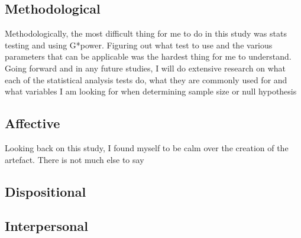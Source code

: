 \documentclass[conference]{IEEEtran}
\begin{document}

\subsection{Methodological}
Methodologically, the most difficult thing for me to do in this study was stats testing and using G*power. Figuring out what test to use and the various parameters that can be applicable was the hardest thing for me to understand. Going forward and in any future studies, I will do extensive research on what each of the statistical analysis tests do, what they are commonly used for and what variables I am looking for when determining sample size or null hypothesis

\subsection{Affective}
Looking back on this study, I found myself to be calm over the creation of the artefact. There is not much else to say
\subsection{Dispositional}
\subsection{Interpersonal}
\end{document}
